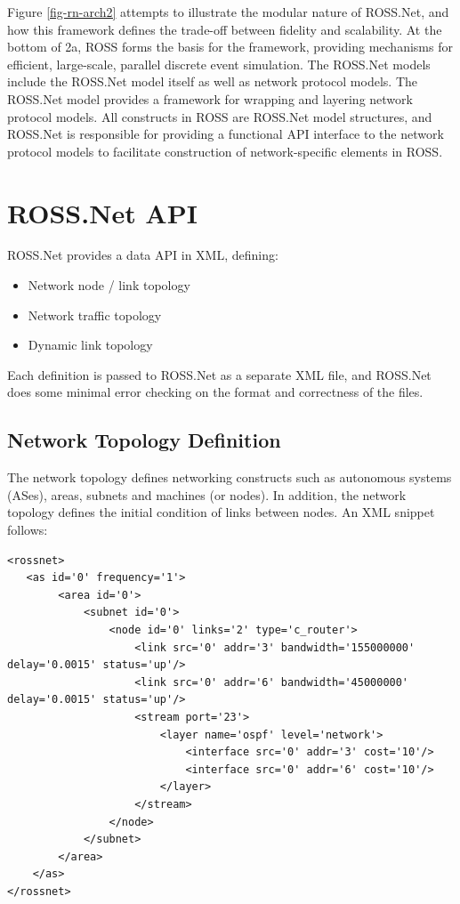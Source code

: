 \documentclass[conference,onecolumn]{IEEEtran}
\begin{document}
Figure \ref{fig-rn-arch2} attempts to illustrate the modular nature of ROSS.Net, and how this framework defines the trade-off between fidelity and scalability.  At the bottom of 2a, ROSS forms the basis for the framework, providing mechanisms for efficient, large-scale, parallel discrete event simulation.  The ROSS.Net models include the ROSS.Net model itself as well as network protocol models.  The ROSS.Net model provides a framework for wrapping and layering network protocol models.  All constructs in ROSS are ROSS.Net model structures, and ROSS.Net is responsible for providing a functional API interface to the network protocol models to facilitate construction of network-specific elements in ROSS.

\section{ROSS.Net API}

ROSS.Net provides a data API in XML, defining:

\begin{itemize}
  \item Network node / link topology
  \item Network traffic topology
  \item Dynamic link topology
\end{itemize}

Each definition is passed to ROSS.Net as a separate XML file, and ROSS.Net does some minimal error checking on the format and correctness of the files.

\subsection{Network Topology Definition}

The network topology defines networking constructs such as autonomous systems (ASes), areas, subnets and machines (or nodes).  In addition, the network topology defines the initial condition of links between nodes.  An XML snippet follows:

\begin{small}\begin{verbatim}
<rossnet>
   <as id='0' frequency='1'>
        <area id='0'>
            <subnet id='0'>
                <node id='0' links='2' type='c_router'>
                    <link src='0' addr='3' bandwidth='155000000' delay='0.0015' status='up'/>
                    <link src='0' addr='6' bandwidth='45000000' delay='0.0015' status='up'/>
                    <stream port='23'>
                        <layer name='ospf' level='network'>
                            <interface src='0' addr='3' cost='10'/>
                            <interface src='0' addr='6' cost='10'/>
                        </layer>
                    </stream>
                </node>
            </subnet>
        </area>
    </as>
</rossnet>
\end{verbatim}\end{small}
\end{document}

